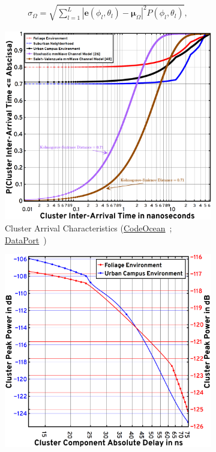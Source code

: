 \documentclass[10pt, twocolumn]{IEEEtran}
\begin{document}
{\begin{align}\label{RMS_DirS}
    \sigma_{\Omega} = \sqrt{\sum_{l=1}^{L}|\mathbf{e}(\phi_{l}, \theta_{l}) - \boldsymbol{\mu}_{\Omega}|^{2}P(\phi_{l}, \theta_{l})},
\end{align}
\begin{figure} [t]
    \centering
    \begin{subfigure}{0.4975\linewidth}
        \centering
        \includegraphics[width=0.97\linewidth]{figs/cluster_arrival_characteristics.png}
        \caption{Cluster Arrival Characteristics (\href{https://codeocean.com/capsule/9545863/tree}{CodeOcean}~\cite{CodeOcean}; \href{http://ieee-dataport.org/12580}{DataPort}~\cite{DataPort})}
        \label{F12a}
    \end{subfigure}
    \begin{subfigure}{0.4925\linewidth}
        \centering
        \includegraphics[width=0.97\linewidth]{figs/cluster_decay_characteristics.png}

\end{subfigure}
\end{figure}}
\end{document}
